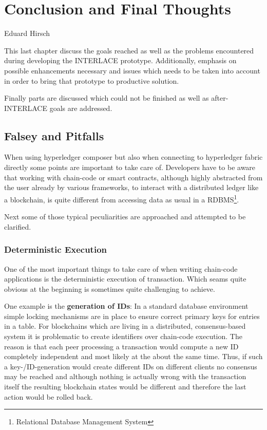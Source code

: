 \chapter{Conclusion and Final Thoughts}
\label{ch:conclusion}

\vspace{-1cm}
\begin{center}
Eduard Hirsch
\end{center}

This last chapter discuss the goals reached as well as the problems encountered during developing the INTERLACE prototype. Additionally, emphasis on possible enhancements necessary and issues which needs to be taken into account in order to bring that prototype to productive solution.

Finally parts are discussed which could not be finished as well as after-INTERLACE goals are addressed.

\section{Falsey and Pitfalls}

When using hyperledger composer but also when connecting to hyperledger fabric directly some points are important to take care of. Developers have to be aware that working with chain-code or smart contracts, although highly abstracted from the user already by various frameworks, to interact with a distributed ledger like a blockchain, is quite different from accessing data as usual in a RDBMS\footnote{Relational Database Management System}.

Next some of those typical peculiarities are approached and attempted to be clarified.

\subsection{Deterministic Execution}

One of the most important things to take care of when writing chain-code applications is the deterministic execution of transaction. Which seams quite obvious at the beginning is sometimes quite challenging to achieve.

One example is the \textbf{generation of IDs}:  In a standard database environment simple locking mechanisms are in place to ensure correct primary keys for entries in a table. For blockchains  which are living in a distributed, consensus-based system it is problematic to create identifiers over chain-code execution. The reason is that each peer processing a transaction would compute a new ID completely independent and most likely at the about the same time. Thus, if such a key-/ID-generation would create different IDs on different clients no consensus may be reached and although nothing is actually wrong with the transaction itself the resulting blockchain states would be different and therefore the last action would be rolled back.

